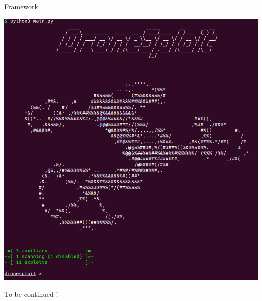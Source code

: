\begin{chaptercover}{Framework}
\begin{discussion}
\includegraphics[width=\linewidth]{figures/dronesploit}

To be continued !
\end{discussion}

\end{chaptercover}
